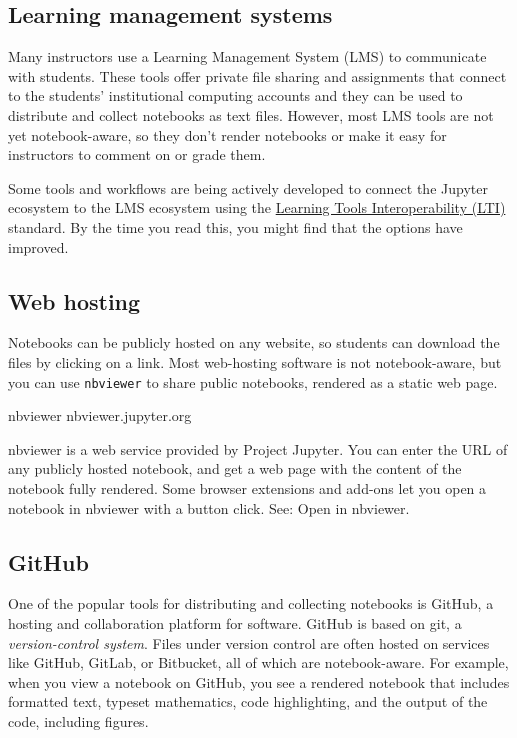 \documentclass[]{book}
\let\BeginKnitrBlock\begin \let\EndKnitrBlock\end
\begin{document}
\hypertarget{learning-management-systems}{%
\subsection{Learning management systems}\label{learning-management-systems}}

Many instructors use a Learning Management System (LMS) to communicate
with students. These tools offer private file sharing and assignments
that connect to the students' institutional computing accounts and
they can be used to distribute and collect notebooks as text
files. However, most LMS tools are not yet notebook-aware, so they
don't render notebooks or make it easy for instructors to comment on
or grade them.

Some tools and workflows are being actively developed to connect the
Jupyter ecosystem to the LMS ecosystem using the \href{https://open.edx.org/learning-tools-interoperability}{Learning Tools
Interoperability
(LTI)}
standard. By the time you read this, you might find that the options
have improved.

\hypertarget{web-hosting}{%
\subsection{Web hosting}\label{web-hosting}}

Notebooks can be publicly hosted on any website, so students can
download the files by clicking on a link. Most web-hosting software is
not notebook-aware, but you can use \texttt{nbviewer} to share public notebooks, rendered as a static web page.

\BeginKnitrBlock{rmdnote}
nbviewer nbviewer.jupyter.org

nbviewer is a web service provided by Project Jupyter. You can enter the URL of any publicly hosted notebook, and get a web page with the content of the notebook fully rendered. Some browser extensions and add-ons let you open a notebook in nbviewer with a button click. See: Open in nbviewer.
\EndKnitrBlock{rmdnote}

\hypertarget{github}{%
\subsection{GitHub}\label{github}}

One of the popular tools for distributing and collecting
notebooks is GitHub, a hosting and collaboration platform for software. GitHub is based on git, a \emph{version-control system}. Files under version
control are often hosted on services like GitHub, GitLab, or
Bitbucket, all of which are notebook-aware. For example,
when you view a notebook on GitHub, you see a rendered notebook that
includes formatted text, typeset mathematics, code highlighting, and
the output of the code, including figures.
\end{document}
